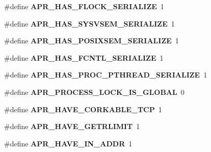 \begin{DoxyCompactItemize}
\item 
\#define {\bfseries A\+P\+R\+\_\+\+H\+A\+S\+\_\+\+F\+L\+O\+C\+K\+\_\+\+S\+E\+R\+I\+A\+L\+I\+ZE}~1\hypertarget{group__apr__platform_ga3cdde1dc287da276eb56d7c5ed351713}{}\label{group__apr__platform_ga3cdde1dc287da276eb56d7c5ed351713}

\item 
\#define {\bfseries A\+P\+R\+\_\+\+H\+A\+S\+\_\+\+S\+Y\+S\+V\+S\+E\+M\+\_\+\+S\+E\+R\+I\+A\+L\+I\+ZE}~1\hypertarget{group__apr__platform_ga3b4f7591d97f21818b51b793752fa5fe}{}\label{group__apr__platform_ga3b4f7591d97f21818b51b793752fa5fe}

\item 
\#define {\bfseries A\+P\+R\+\_\+\+H\+A\+S\+\_\+\+P\+O\+S\+I\+X\+S\+E\+M\+\_\+\+S\+E\+R\+I\+A\+L\+I\+ZE}~1\hypertarget{group__apr__platform_ga100a44703cbec87774ad3ba78ce4372a}{}\label{group__apr__platform_ga100a44703cbec87774ad3ba78ce4372a}

\item 
\#define {\bfseries A\+P\+R\+\_\+\+H\+A\+S\+\_\+\+F\+C\+N\+T\+L\+\_\+\+S\+E\+R\+I\+A\+L\+I\+ZE}~1\hypertarget{group__apr__platform_ga372220e70e4da519ebcaaf8476525227}{}\label{group__apr__platform_ga372220e70e4da519ebcaaf8476525227}

\item 
\#define {\bfseries A\+P\+R\+\_\+\+H\+A\+S\+\_\+\+P\+R\+O\+C\+\_\+\+P\+T\+H\+R\+E\+A\+D\+\_\+\+S\+E\+R\+I\+A\+L\+I\+ZE}~1\hypertarget{group__apr__platform_gabc09d4599769b9cef0e972b0050c9e11}{}\label{group__apr__platform_gabc09d4599769b9cef0e972b0050c9e11}

\item 
\#define {\bfseries A\+P\+R\+\_\+\+P\+R\+O\+C\+E\+S\+S\+\_\+\+L\+O\+C\+K\+\_\+\+I\+S\+\_\+\+G\+L\+O\+B\+AL}~0\hypertarget{group__apr__platform_ga2faf50198d02b5f6e21c32429ca1c5b4}{}\label{group__apr__platform_ga2faf50198d02b5f6e21c32429ca1c5b4}

\item 
\#define {\bfseries A\+P\+R\+\_\+\+H\+A\+V\+E\+\_\+\+C\+O\+R\+K\+A\+B\+L\+E\+\_\+\+T\+CP}~1\hypertarget{group__apr__platform_gab841a4b1a92684a089fbab9e7bce737a}{}\label{group__apr__platform_gab841a4b1a92684a089fbab9e7bce737a}

\item 
\#define {\bfseries A\+P\+R\+\_\+\+H\+A\+V\+E\+\_\+\+G\+E\+T\+R\+L\+I\+M\+IT}~1\hypertarget{group__apr__platform_ga58025dd20776cbc5a5e7a18f1ac6d5ad}{}\label{group__apr__platform_ga58025dd20776cbc5a5e7a18f1ac6d5ad}

\item 
\#define {\bfseries A\+P\+R\+\_\+\+H\+A\+V\+E\+\_\+\+I\+N\+\_\+\+A\+D\+DR}~1\hypertarget{group__apr__platform_ga2713eb83fc527f0b262b58c0c449cdcb}{}\label{group__apr__platform_ga2713eb83fc527f0b262b58c0c449cdcb}


\end{DoxyCompactItemize}
